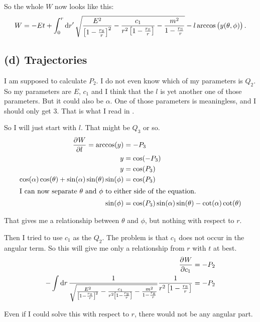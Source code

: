 So the whole $W$ now looks like this:
\[
    W = - Et + \int_0^r \dif{r'} \, \sqrt{ \frac{E^2}{\Group{1 - \frac{r_\text S}r}^2} -
        \frac{c_1}{r^2 \Group{1 - \frac{r_\text S}r}} - \frac{m^2}{1 - \frac{r_\text
    S}{r}}} - l \arccos\del{y(\theta, \phi)}.
\]

\subsection*{(d) Trajectories}

I am supposed to calculate $P_2$. I do not even know which of my parameters is
$Q_2$. So my parameters are $E$, $c_1$ and I think that the $l$ is yet another
one of those parameters. But it could also be $\alpha$. One of those parameters
is meaningless, and I should only get 3. That is what I read in
\parencite{Kuypers/Mechanik}.

So I will just start with $l$. That might be $Q_3$ or so.
\begin{align*}
    \dpd Wl = \arccos(y) &= -P_3 \\
    y &= \cos(-P_3) \\
    y &= \cos(P_3) \\
    \cos(\alpha) \cos(\theta) + \sin(\alpha) \sin(\theta) \sin(\phi) &= \cos(P_3) \\
    \intertext{%
        I can now separate $\theta$ and $\phi$ to either side of the equation.
    }
    \sin(\phi) &= \cos(P_3) \sin(\alpha) \sin(\theta) - \cot(\alpha)
    \cot(\theta)
\end{align*}

That gives me a relationship between $\theta$ and $\phi$, but nothing with
respect to $r$.

Then I tried to use $c_1$ as the $Q_2$. The problem is that $c_1$ does not
occur in the angular term. So this will give me only a relationship from $r$
with $t$ at best.
\begin{align*}
    \dpd W{{c_1}} &= -P_2 \\
    - \int \dif r\, \frac{1}{\sqrt{ \frac{E^2}{\Group{1 - \frac{r_\text S}r}^2} -
        \frac{c_1}{r^2 \Group{1 - \frac{r_\text S}r}} - \frac{m^2}{1 - \frac{r_\text
    S}{r}}}} \frac{1}{r^2 \sbr{1 - \frac{r_\text S}{r}}} &= -P_2
\end{align*}

Even if I could solve this with respect to $r$, there would not be any angular
part.

\IfFileExists{\bibliographyfile}{
    \printbibliography
}{}



